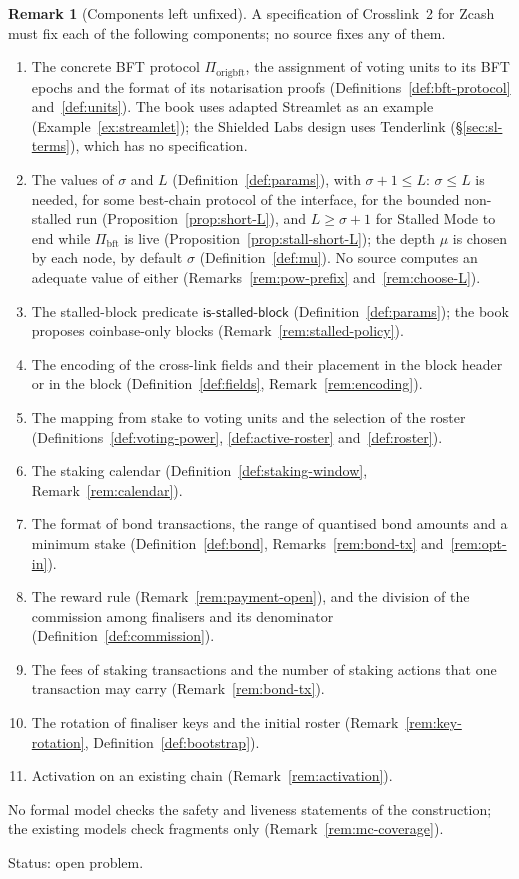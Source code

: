 \documentclass[11pt,a4paper]{article}
\theoremstyle{definition}
\newtheorem{remark}[theorem]{Remark}
\newcommand{\bft}{\mathrm{bft}}
\newcommand{\Piorigbft}{\Pi_{\mathrm{origbft}}}
\newcommand{\Pibft}{\Pi_{\bft}}
\newcommand{\isstalledblock}{\mathsf{is\text{-}stalled\text{-}block}}
\begin{document}
\begin{remark}[Components left unfixed]\label{rem:spec-ledger}
A specification of Crosslink~2 for Zcash must fix each of the following
components; no source fixes any of them.
\begin{enumerate}[label=(\arabic*)]
\item The concrete BFT protocol $\Piorigbft$, the assignment of voting units
  to its BFT epochs and the format of its notarisation proofs
  (Definitions~\ref{def:bft-protocol} and~\ref{def:units}). The book uses
  adapted Streamlet as an example (Example~\ref{ex:streamlet}); the Shielded
  Labs design uses Tenderlink (\S\ref{sec:sl-terms}), which has no
  specification.
\item The values of $\sigma$ and $L$ (Definition~\ref{def:params}), with
  $\sigma + 1 \le L$: $\sigma \le L$ is needed, for some best-chain protocol
  of the interface, for the bounded non-stalled run
  (Proposition~\ref{prop:short-L}), and $L \ge \sigma + 1$ for Stalled Mode
  to end while $\Pibft$ is live (Proposition~\ref{prop:stall-short-L}); the
  depth $\mu$ is chosen by each node, by default $\sigma$
  (Definition~\ref{def:mu}). No source computes an adequate value of either
  (Remarks~\ref{rem:pow-prefix} and~\ref{rem:choose-L}).
\item The stalled-block predicate $\isstalledblock$
  (Definition~\ref{def:params}); the book proposes coinbase-only blocks
  (Remark~\ref{rem:stalled-policy}).
\item The encoding of the cross-link fields and their placement in the block
  header or in the block (Definition~\ref{def:fields},
  Remark~\ref{rem:encoding}).
\item The mapping from stake to voting units and the selection of the roster
  (Definitions~\ref{def:voting-power}, \ref{def:active-roster}
  and~\ref{def:roster}).
\item The staking calendar (Definition~\ref{def:staking-window},
  Remark~\ref{rem:calendar}).
\item The format of bond transactions, the range of quantised bond amounts
  and a minimum stake (Definition~\ref{def:bond}, Remarks~\ref{rem:bond-tx}
  and~\ref{rem:opt-in}).
\item The reward rule (Remark~\ref{rem:payment-open}), and the division of
  the commission among finalisers and its denominator
  (Definition~\ref{def:commission}).
\item The fees of staking transactions and the number of staking actions that
  one transaction may carry (Remark~\ref{rem:bond-tx}).
\item The rotation of finaliser keys and the initial roster
  (Remark~\ref{rem:key-rotation}, Definition~\ref{def:bootstrap}).
\item Activation on an existing chain (Remark~\ref{rem:activation}).
\end{enumerate}
No formal model checks the safety and liveness statements of the
construction; the existing models check fragments only
(Remark~\ref{rem:mc-coverage}).

Status: open problem.
\end{remark}
\end{document}
